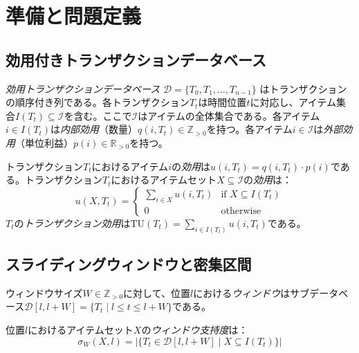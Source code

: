 \section{準備と問題定義}
\label{sec:preliminaries}

\subsection{効用付きトランザクションデータベース}

\begin{definition}[効用トランザクションデータベース]
\emph{効用トランザクションデータベース} $\mathcal{D} = \{T_0, T_1, \ldots, T_{n-1}\}$ はトランザクションの順序付き列である。各トランザクション$T_t$は時間位置$t$に対応し、アイテム集合$I(T_t) \subseteq \mathcal{I}$を含む。ここで$\mathcal{I}$はアイテムの全体集合である。各アイテム$i \in I(T_t)$は\emph{内部効用}（数量）$q(i, T_t) \in \mathbb{Z}_{>0}$を持つ。各アイテム$i \in \mathcal{I}$は\emph{外部効用}（単位利益）$p(i) \in \mathbb{R}_{>0}$を持つ。
\end{definition}

\begin{definition}[アイテムおよびアイテムセットの効用]
トランザクション$T_t$におけるアイテム$i$の\emph{効用}は$u(i, T_t) = q(i, T_t) \cdot p(i)$である。トランザクション$T_t$におけるアイテムセット$X \subseteq \mathcal{I}$の\emph{効用}は：
\begin{equation}
    u(X, T_t) = \begin{cases}
        \sum_{i \in X} u(i, T_t) & \text{if } X \subseteq I(T_t) \\
        0 & \text{otherwise}
    \end{cases}
\end{equation}
$T_t$の\emph{トランザクション効用}は$\text{TU}(T_t) = \sum_{i \in I(T_t)} u(i, T_t)$である。
\end{definition}

\subsection{スライディングウィンドウと密集区間}

\begin{definition}[スライディングウィンドウ]
ウィンドウサイズ$W \in \mathbb{Z}_{>0}$に対して、位置$l$における\emph{ウィンドウ}はサブデータベース$\mathcal{D}[l, l{+}W] = \{T_t \mid l \leq t \leq l + W\}$である。
\end{definition}

\begin{definition}[ウィンドウ支持度]
位置$l$におけるアイテムセット$X$の\emph{ウィンドウ支持度}は：
\begin{equation}
    \sigma_W(X, l) = |\{T_t \in \mathcal{D}[l, l{+}W] \mid X \subseteq I(T_t)\}|
\end{equation}
\end{definition}

